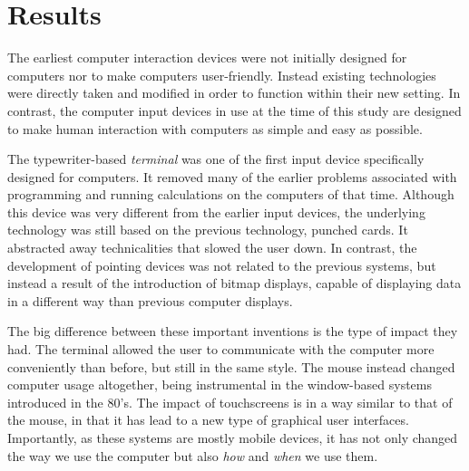 

\section{Results}


The earliest computer interaction devices were not initially designed for computers nor to make computers user-friendly. Instead existing technologies were directly taken and modified in order to function within their new setting. In contrast, the computer input devices in use at the time of this study are designed to make human interaction with computers as simple and easy as possible.

The typewriter-based \emph{terminal} was one of the first input device specifically designed for computers. It removed many of the earlier problems associated with programming and running calculations on the computers of that time. Although this device was very different from the earlier input devices, the underlying technology was still based on the previous technology, punched cards. It abstracted away technicalities that slowed the user down. In contrast, the development of pointing devices was not related to the previous systems, but instead a result of the introduction of bitmap displays, capable of displaying data in a different way than previous computer displays.

The big difference between these important inventions is the type of impact they had. The terminal allowed the user to communicate with the computer more conveniently than before, but still in the same style. The mouse instead changed computer usage altogether, being instrumental in the window-based systems introduced in the 80's. The impact of touchscreens is in a way similar to that of the mouse, in that it has lead to a new type of graphical user interfaces. Importantly, as these systems are mostly mobile devices, it has not only changed the way we use the computer but also \emph{how} and \emph{when} we use them.



